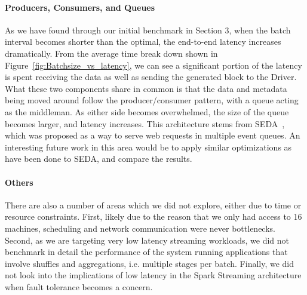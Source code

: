 \paragraph{Producers, Consumers, and Queues}
As we have found through our initial benchmark in Section 3, when the batch interval becomes shorter than the optimal, the end-to-end latency increases dramatically. From the average time break down shown in Figure~\ref{fig:Batchsize_vs_latency}, we can see a significant portion of the latency is spent receiving the data as well as sending the generated block to the Driver. What these two components share in common is that the data and metadata being moved around follow the producer/consumer pattern, with a queue acting as the middleman. As either side becomes overwhelmed, the size of the queue becomes larger, and latency increases. This architecture stems from SEDA~\cite{SEDA}, which was proposed as a way to serve web requests in multiple event queues. An interesting future work in this area would be to apply similar optimizations as have been done to SEDA, and compare the results.

\paragraph{Others} There are also a number of areas which we did not explore, either due to time or resource constraints. First, likely due to the reason that we only had access to 16 machines, scheduling and network communication were never bottlenecks. Second, as we are targeting very low latency streaming workloads, we did not benchmark in detail the performance of the system running applications that involve shuffles and aggregations, i.e. multiple stages per batch. Finally, we did not look into the implications of low latency in the Spark Streaming architecture when fault tolerance becomes a concern.
